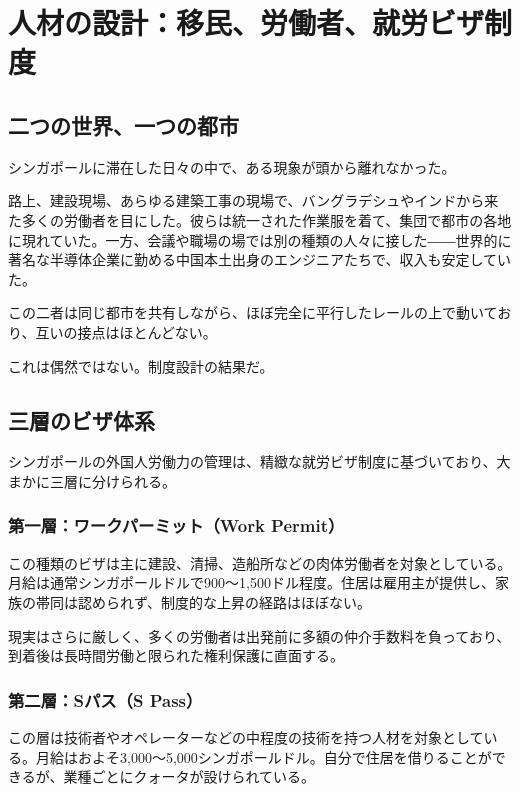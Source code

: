 \chapter{人材の設計：移民、労働者、就労ビザ制度}

\section{二つの世界、一つの都市}

シンガポールに滞在した日々の中で、ある現象が頭から離れなかった。

路上、建設現場、あらゆる建築工事の現場で、バングラデシュやインドから来た多くの労働者を目にした。彼らは統一された作業服を着て、集団で都市の各地に現れていた。一方、会議や職場の場では別の種類の人々に接した――世界的に著名な半導体企業に勤める中国本土出身のエンジニアたちで、収入も安定していた。

この二者は同じ都市を共有しながら、ほぼ完全に平行したレールの上で動いており、互いの接点はほとんどない。

これは偶然ではない。制度設計の結果だ。

\section{三層のビザ体系}

シンガポールの外国人労働力の管理は、精緻な就労ビザ制度に基づいており、大まかに三層に分けられる。

\subsection*{第一層：ワークパーミット（Work Permit）}

この種類のビザは主に建設、清掃、造船所などの肉体労働者を対象としている。月給は通常シンガポールドルで900〜1,500ドル程度。住居は雇用主が提供し、家族の帯同は認められず、制度的な上昇の経路はほぼない。

現実はさらに厳しく、多くの労働者は出発前に多額の仲介手数料を負っており、到着後は長時間労働と限られた権利保護に直面する。

\subsection*{第二層：Sパス（S Pass）}

この層は技術者やオペレーターなどの中程度の技術を持つ人材を対象としている。月給はおよそ3,000〜5,000シンガポールドル。自分で住居を借りることができるが、業種ごとにクォータが設けられている。

